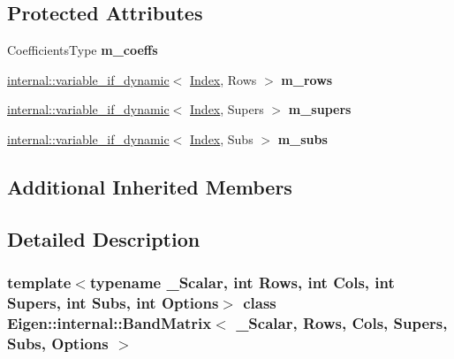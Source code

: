 \subsection*{Protected Attributes}
\begin{DoxyCompactItemize}
\item 
\mbox{\label{class_eigen_1_1internal_1_1_band_matrix_a838c9d05b9564e31d0302653dee4aeb8}} 
Coefficients\+Type {\bfseries m\+\_\+coeffs}
\item 
\mbox{\label{class_eigen_1_1internal_1_1_band_matrix_a03a436804ed5c1c96f0c96695c03abd1}} 
\mbox{\hyperlink{class_eigen_1_1internal_1_1variable__if__dynamic}{internal\+::variable\+\_\+if\+\_\+dynamic}}$<$ \mbox{\hyperlink{struct_eigen_1_1_eigen_base_a554f30542cc2316add4b1ea0a492ff02}{Index}}, Rows $>$ {\bfseries m\+\_\+rows}
\item 
\mbox{\label{class_eigen_1_1internal_1_1_band_matrix_a534f26dad48560f34066266f1b53a78f}} 
\mbox{\hyperlink{class_eigen_1_1internal_1_1variable__if__dynamic}{internal\+::variable\+\_\+if\+\_\+dynamic}}$<$ \mbox{\hyperlink{struct_eigen_1_1_eigen_base_a554f30542cc2316add4b1ea0a492ff02}{Index}}, Supers $>$ {\bfseries m\+\_\+supers}
\item 
\mbox{\label{class_eigen_1_1internal_1_1_band_matrix_a5df95e55263d64543f369a65af98d7d8}} 
\mbox{\hyperlink{class_eigen_1_1internal_1_1variable__if__dynamic}{internal\+::variable\+\_\+if\+\_\+dynamic}}$<$ \mbox{\hyperlink{struct_eigen_1_1_eigen_base_a554f30542cc2316add4b1ea0a492ff02}{Index}}, Subs $>$ {\bfseries m\+\_\+subs}
\end{DoxyCompactItemize}
\subsection*{Additional Inherited Members}


\subsection{Detailed Description}
\subsubsection*{template$<$typename \+\_\+\+Scalar, int Rows, int Cols, int Supers, int Subs, int Options$>$\newline
class Eigen\+::internal\+::\+Band\+Matrix$<$ \+\_\+\+Scalar, Rows, Cols, Supers, Subs, Options $>$}


